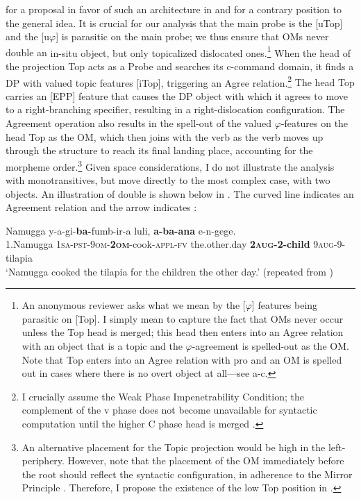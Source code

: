 \documentclass[output=paper
,newtxmath
,modfonts
,nonflat]{langsci/langscibook}
\begin{document}
{\citet{landmantoappear} for a proposal in favor of such an architecture in  and \citet{horvath2007} for a contrary position to the general idea.}\textup{ It is crucial for our analysis that the main probe is the [uTop] and the [u$\varphi $] is parasitic on the main probe; we thus ensure that OMs never double an} in-situ \textup{object, but only topicalized dislocated ones}.\footnote{An anonymous reviewer asks what we mean by the [$\varphi $] features being parasitic on [Top]. I simply mean to capture the fact that OMs never occur unless the Top head is merged; this head then enters into an Agree relation with an object that is a topic and the $\varphi $-agreement is spelled-out as the OM. Note that Top enters into an Agree relation with pro and an OM is spelled out in cases where there is no overt object at all—see a-c.}\textup{ When the head of the projection Top acts as a Probe and searches its c-command domain, it finds a DP with valued topic features [iTop], triggering an Agree relation}.\footnote{I crucially assume the Weak Phase Impenetrability Condition; the complement of the v phase does not become unavailable for syntactic computation until the higher C phase head is merged \citep{Citko2014}.}\textup{ The head Top carries an [EPP] feature that causes the DP object with which it agrees to move to a right-branching specifier, resulting in a right-dislocation configuration. The Agreement operation also results in the spell-out of the valued $\varphi $-features on the head Top as the  OM, which then joins with the verb as the verb moves up through the structure to reach its final landing place, accounting for the morpheme order}.\footnote{An alternative placement for the Topic projection would be high in the left-periphery. However, note that the placement of the OM immediately before the root should reflect the syntactic configuration, in adherence to the Mirror Principle \citep{Baker1985}. Therefore, I propose the existence of the low Top position in .}\textup{ Given space considerations, I do not illustrate the analysis with monotransitives, but move directly to the most complex case, with two objects. An illustration of double  is shown below in . The curved line indicates an Agreement relation and the arrow indicates :}

\ea\label{ex:ranero:31}
\gll Namugga     y-a-gi{}-\textbf{ba-}fumb-ir-a                     luli,                \textbf{a-ba-ana}      e-n-gege.\\
1.Namugga \textsc{1sa-pst-9om}\textsc{{}-}\textbf{\textsc{2om}}{}-cook-\textsc{appl-fv} the.other.day \textbf{2\textsc{aug}}\textbf{{}-2-child} 9\textsc{aug}{}-9-tilapia\\
\glt ‘Namugga cooked the tilapia for the children the other day.’ (repeated from )
\end{document}
